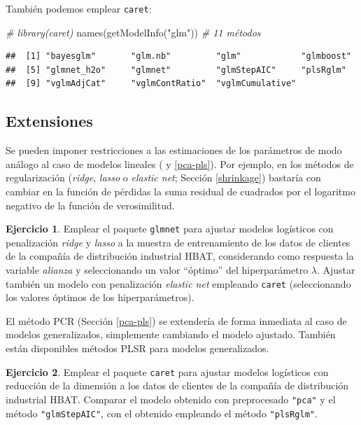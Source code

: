 \documentclass[
  spanish,
]{book}
\newenvironment{Shaded}{\begin{snugshade}}{\end{snugshade}}
\newcommand{\CommentTok}[1]{\textcolor[rgb]{0.56,0.35,0.01}{\textit{#1}}}
\newcommand{\FunctionTok}[1]{\textcolor[rgb]{0.00,0.00,0.00}{#1}}
\newcommand{\NormalTok}[1]{#1}
\newcommand{\StringTok}[1]{\textcolor[rgb]{0.31,0.60,0.02}{#1}}
\theoremstyle{break}
\theoremstyle{definition}
\theoremstyle{definition}
\theoremstyle{definition}
\newtheorem{exercise}{Ejercicio}[chapter]
\theoremstyle{definition}
\theoremstyle{remark}
\begin{document}
También podemos emplear \texttt{caret}:

\begin{Shaded}
\begin{Highlighting}[]
\CommentTok{\# library(caret)}
\FunctionTok{names}\NormalTok{(}\FunctionTok{getModelInfo}\NormalTok{(}\StringTok{"glm"}\NormalTok{)) }\CommentTok{\# 11 métodos}
\end{Highlighting}
\end{Shaded}

\begin{verbatim}
##  [1] "bayesglm"       "glm.nb"         "glm"            "glmboost"      
##  [5] "glmnet_h2o"     "glmnet"         "glmStepAIC"     "plsRglm"       
##  [9] "vglmAdjCat"     "vglmContRatio"  "vglmCumulative"
\end{verbatim}

\hypertarget{extensiones}{%
\subsection{Extensiones}\label{extensiones}}

Se pueden imponer restricciones a las estimaciones de los parámetros de modo análogo al caso de modelos lineales ( y \ref{pca-pls}).
Por ejemplo, en los métodos de regularización (\emph{ridge}, \emph{lasso} o \emph{elastic net}; Sección \ref{shrinkage}) bastaría con cambiar en la función de pérdidas la suma residual de cuadrados por el logaritmo negativo de la función de verosimilitud.

\begin{exercise}
\protect\hypertarget{exr:glmnet}{}{\label{exr:glmnet} }
Emplear el paquete \texttt{glmnet} para ajustar modelos logísticos con penalización \emph{ridge} y \emph{lasso} a la muestra de entrenamiento de los datos de clientes de la compañía de distribución industrial HBAT, considerando como respuesta la variable \emph{alianza} y seleccionando un valor ``óptimo'' del hiperparámetro \(\lambda\).
Ajustar también un modelo con penalización \emph{elastic net} empleando \texttt{caret} (seleccionando los valores óptimos de los hiperparámetros).
\end{exercise}

El método PCR (Sección \ref{pca-pls}) se extendería de forma inmediata al caso de modelos generalizados, simplemente cambiando el modelo ajustado.
También están disponibles métodos PLSR para modelos generalizados.

\begin{exercise}
\protect\hypertarget{exr:glm-reduccion}{}{\label{exr:glm-reduccion} }
Emplear el paquete \texttt{caret} para ajustar modelos logísticos con reducción de la dimensión a los datos de clientes de la compañía de distribución industrial HBAT. Comparar el modelo obtenido con preprocesado \texttt{"pca"} y el método \texttt{"glmStepAIC"}, con el obtenido empleando el método \texttt{"plsRglm"}.
\end{exercise}
\end{document}
